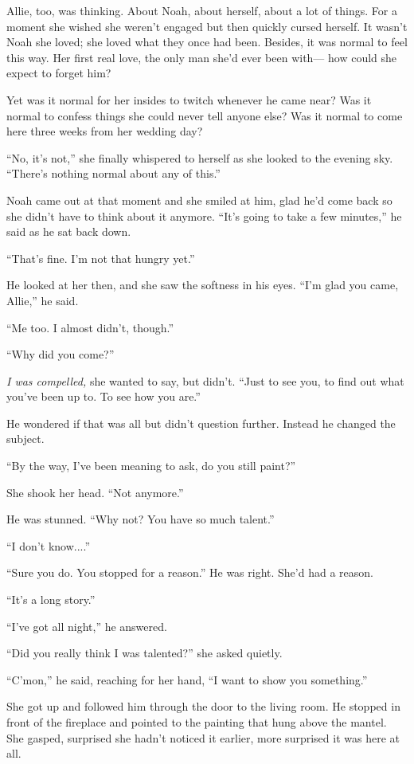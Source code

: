 \documentclass[10pt, twoside, openright]{book}
\begin{document}
Allie, too, was thinking. About Noah, about herself, about a lot of
things. For a moment she wished she weren't engaged but then quickly
cursed herself. It wasn't Noah she loved; she loved what they once had
been. Besides, it was normal to feel this way. Her first real love, the
only man she'd ever been with--- how could she expect to forget him?

Yet was it normal for her insides to twitch whenever he came near? Was
it normal to confess things she could never tell anyone else? Was it
normal to come here three weeks from her wedding day?

``No, it's not,'' she finally whispered to herself as she looked to the
evening sky. ``There's nothing normal about any of this.''

Noah came out at that moment and she smiled at him, glad he'd come back
so she didn't have to think about it anymore. ``It's going to take a few
minutes,'' he said as he sat back down.


``That's fine. I'm not that hungry yet.''


He looked at her then, and she saw the softness in his eyes. ``I'm glad
you came, Allie,'' he said.


``Me too. I almost didn't, though.''

``Why did you come?''


\emph{I was compelled,} she wanted to say, but didn't. ``Just to see
you, to find out what you've been up to. To see how you are.''

He wondered if that was all but didn't question further. Instead he
changed the subject.


``By the way, I've been meaning to ask, do you still paint?''

She shook her head. ``Not anymore.''

He was stunned. ``Why not? You have so much talent.''

``I don't know....''

``Sure you do. You stopped for a reason.'' He was right. She'd had a
reason.

``It's a long story.''

``I've got all night,'' he answered.

``Did you really think I was talented?'' she asked quietly.


``C'mon,'' he said, reaching for her hand, ``I want to show you
something.''

She got up and followed him through the door to the living room. He
stopped in front of the fireplace and pointed to the painting that hung
above the mantel. She gasped, surprised she hadn't noticed it earlier,
more surprised it was here at all.
\end{document}
